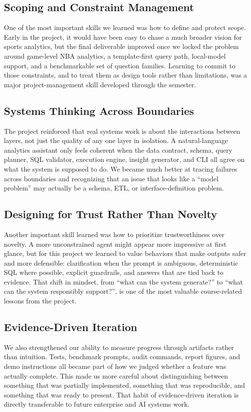 \documentclass[11pt]{article}
\begin{document}
\subsection{Scoping and Constraint Management}
One of the most important skills we learned was how to define and protect scope. Early in the project, it would have been easy to chase a much broader vision for sports analytics, but the final deliverable improved once we locked the problem around game-level NBA analytics, a template-first query path, local-model support, and a benchmarkable set of question families. Learning to commit to those constraints, and to treat them as design tools rather than limitations, was a major project-management skill developed through the semester.

\subsection{Systems Thinking Across Boundaries}
The project reinforced that real systems work is about the interactions between layers, not just the quality of any one layer in isolation. A natural-language analytics assistant only feels coherent when the data contract, schema, query planner, SQL validator, execution engine, insight generator, and CLI all agree on what the system is supposed to do. We became much better at tracing failures across boundaries and recognizing that an issue that looks like a ``model problem'' may actually be a schema, ETL, or interface-definition problem.

\subsection{Designing for Trust Rather Than Novelty}
Another important skill learned was how to prioritize trustworthiness over novelty. A more unconstrained agent might appear more impressive at first glance, but for this project we learned to value behaviors that make outputs safer and more defensible: clarification when the prompt is ambiguous, deterministic SQL where possible, explicit guardrails, and answers that are tied back to evidence. That shift in mindset, from ``what can the system generate?'' to ``what can the system responsibly support?'', is one of the most valuable course-related lessons from the project.

\subsection{Evidence-Driven Iteration}
We also strengthened our ability to measure progress through artifacts rather than intuition. Tests, benchmark prompts, audit commands, report figures, and demo instructions all became part of how we judged whether a feature was actually complete. This made us more careful about distinguishing between something that was partially implemented, something that was reproducible, and something that was ready to present. That habit of evidence-driven iteration is directly transferable to future enterprise and AI systems work.
\end{document}
